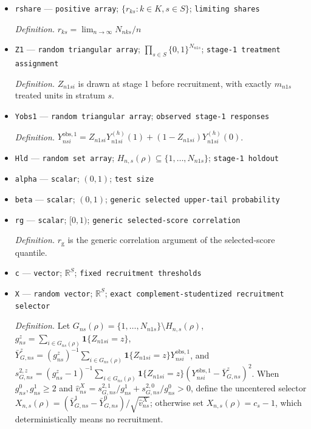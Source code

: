 \documentclass{article}
\begin{document}
\begin{itemize}
  \item \texttt{rshare} --- \texttt{positive array}; \(\{r_{ks}:k\in K,s\in S\}\); \texttt{limiting shares}
  \par\smallskip\noindent\emph{Definition.} \(r_{ks}=\lim_{n\to\infty}N_{nks}/n\)
  \item \texttt{Z1} --- \texttt{random triangular array}; \(\prod_{s\in S}\{0,1\}^{N_{n1s}}\); \texttt{stage-\allowbreak{}1 treatment assignment}
  \par\smallskip\noindent\emph{Definition.} \(Z_{n1si}\) is drawn at stage 1 before recruitment, with exactly \(m_{n1s}\) treated units in stratum \(s\).
  \item \texttt{Yobs1} --- \texttt{random triangular array}; \texttt{observed stage-\allowbreak{}1 responses}
  \par\smallskip\noindent\emph{Definition.} \(Y^{\mathrm{obs},1}_{nsi}=Z_{n1si}Y^{(h)}_{n1si}(1)+(1-Z_{n1si})Y^{(h)}_{n1si}(0)\).
  \item \texttt{Hld} --- \texttt{random set array}; \(H_{n,s}(\rho)\subseteq\{1,\ldots,N_{n1s}\}\); \texttt{stage-\allowbreak{}1 holdout}
  \item \texttt{alpha} --- \texttt{scalar}; \((0,1)\); \texttt{test size}
  \item \texttt{beta} --- \texttt{scalar}; \((0,1)\); \texttt{generic selected upper-\allowbreak{}tail probability}
  \item \texttt{rg} --- \texttt{scalar}; \([0,1)\); \texttt{generic selected-\allowbreak{}score correlation}
  \par\smallskip\noindent\emph{Definition.} \(r_{\mathrm g}\) is the generic correlation argument of the selected-score quantile.
  \item \texttt{c} --- \texttt{vector}; \(\mathbb{R}^{S}\); \texttt{fixed recruitment thresholds}
  \item \texttt{X} --- \texttt{random vector}; \(\mathbb R^{S}\); \texttt{exact complement-\allowbreak{}studentized recruitment selector}
  \par\smallskip\noindent\emph{Definition.} Let \(G_{ns}(\rho)=\{1,\ldots,N_{n1s}\}\setminus H_{n,s}(\rho)\), \(g^z_{ns}=\sum_{i\in G_{ns}(\rho)}\mathbf 1\{Z_{n1si}=z\}\), \(\bar Y^z_{G,ns}=(g^z_{ns})^{-1}\sum_{i\in G_{ns}(\rho)}\mathbf 1\{Z_{n1si}=z\}Y^{\mathrm{obs},1}_{nsi}\), and \(s^{2,z}_{G,ns}=(g^z_{ns}-1)^{-1}\sum_{i\in G_{ns}(\rho)}\mathbf 1\{Z_{n1si}=z\}(Y^{\mathrm{obs},1}_{nsi}-\bar Y^z_{G,ns})^2\). When \(g^0_{ns},g^1_{ns}\ge2\) and \(\widehat v^X_{ns}=s^{2,1}_{G,ns}/g^1_{ns}+s^{2,0}_{G,ns}/g^0_{ns}>0\), define the uncentered selector \(X_{n,s}(\rho)=(\bar Y^1_{G,ns}-\bar Y^0_{G,ns})/\sqrt{\widehat v^X_{ns}}\); otherwise set \(X_{n,s}(\rho)=c_s-1\), which deterministically means no recruitment.

\end{itemize}
\end{document}
